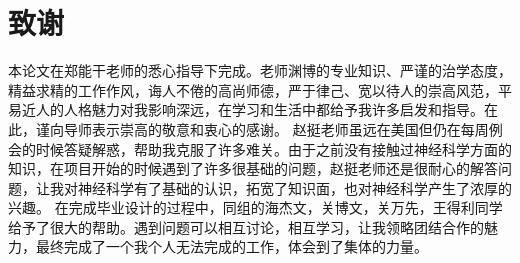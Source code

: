 \chapter*{致谢}
本论文在郑能干老师的悉心指导下完成。老师渊博的专业知识、严谨的治学态度，精益求精的工作作风，诲人不倦的高尚师德，严于律己、宽以待人的崇高风范，平易近人的人格魅力对我影响深远，在学习和生活中都给予我许多启发和指导。在此，谨向导师表示崇高的敬意和衷心的感谢。
赵挺老师虽远在美国但仍在每周例会的时候答疑解惑，帮助我克服了许多难关。由于之前没有接触过神经科学方面的知识，在项目开始的时候遇到了许多很基础的问题，赵挺老师还是很耐心的解答问题，让我对神经科学有了基础的认识，拓宽了知识面，也对神经科学产生了浓厚的兴趣。
在完成毕业设计的过程中，同组的海杰文，关博文，关万先，王得利同学给予了很大的帮助。遇到问题可以相互讨论，相互学习，让我领略团结合作的魅力，最终完成了一个我个人无法完成的工作，体会到了集体的力量。

